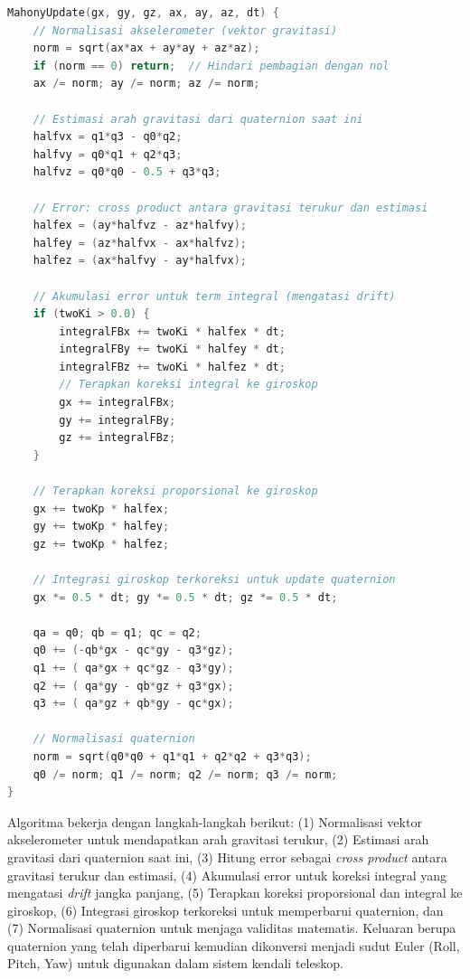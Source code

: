 \begin{lstlisting}[caption={Pseudocode Mahony Filter untuk Estimasi Orientasi}, label={code:4.pseudocode_mahony}, language=C]
MahonyUpdate(gx, gy, gz, ax, ay, az, dt) {
    // Normalisasi akselerometer (vektor gravitasi)
    norm = sqrt(ax*ax + ay*ay + az*az);
    if (norm == 0) return;  // Hindari pembagian dengan nol
    ax /= norm; ay /= norm; az /= norm;

    // Estimasi arah gravitasi dari quaternion saat ini
    halfvx = q1*q3 - q0*q2;
    halfvy = q0*q1 + q2*q3;
    halfvz = q0*q0 - 0.5 + q3*q3;

    // Error: cross product antara gravitasi terukur dan estimasi
    halfex = (ay*halfvz - az*halfvy);
    halfey = (az*halfvx - ax*halfvz);
    halfez = (ax*halfvy - ay*halfvx);

    // Akumulasi error untuk term integral (mengatasi drift)
    if (twoKi > 0.0) {
        integralFBx += twoKi * halfex * dt;
        integralFBy += twoKi * halfey * dt;
        integralFBz += twoKi * halfez * dt;
        // Terapkan koreksi integral ke giroskop
        gx += integralFBx;
        gy += integralFBy;
        gz += integralFBz;
    }

    // Terapkan koreksi proporsional ke giroskop
    gx += twoKp * halfex;
    gy += twoKp * halfey;
    gz += twoKp * halfez;

    // Integrasi giroskop terkoreksi untuk update quaternion
    gx *= 0.5 * dt; gy *= 0.5 * dt; gz *= 0.5 * dt;
    
    qa = q0; qb = q1; qc = q2;
    q0 += (-qb*gx - qc*gy - q3*gz);
    q1 += ( qa*gx + qc*gz - q3*gy);
    q2 += ( qa*gy - qb*gz + q3*gx);
    q3 += ( qa*gz + qb*gy - qc*gx);

    // Normalisasi quaternion
    norm = sqrt(q0*q0 + q1*q1 + q2*q2 + q3*q3);
    q0 /= norm; q1 /= norm; q2 /= norm; q3 /= norm;
}
\end{lstlisting}

Algoritma bekerja dengan langkah-langkah berikut: (1) Normalisasi vektor akselerometer untuk mendapatkan arah gravitasi terukur, (2) Estimasi arah gravitasi dari quaternion saat ini, (3) Hitung error sebagai \textit{cross product} antara gravitasi terukur dan estimasi, (4) Akumulasi error untuk koreksi integral yang mengatasi \textit{drift} jangka panjang, (5) Terapkan koreksi proporsional dan integral ke giroskop, (6) Integrasi giroskop terkoreksi untuk memperbarui quaternion, dan (7) Normalisasi quaternion untuk menjaga validitas matematis. Keluaran berupa quaternion yang telah diperbarui kemudian dikonversi menjadi sudut Euler (Roll, Pitch, Yaw) untuk digunakan dalam sistem kendali teleskop. \par


